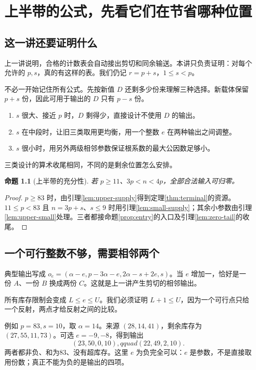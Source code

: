 \documentclass[11pt,a4paper,oneside,openany]{book}
\newtheorem{proposition}[theorem]{命题}
\theoremstyle{definition}
\numberwithin{equation}{chapter}
\begin{document}
\chapter{上半带的公式，先看它们在节省哪种位置}\label{ch:upper}
\section{这一讲还要证明什么}
上一讲说明，合格的计数表会自动接出剪切和同余输送。本讲只负责证明：对每个允许的 $p,s$，真的有这样的表。我们仍记 $r=p+s$，$1\le s<p$。

不必一开始记住所有公式。先按新值 $D$ 还剩多少份来理解三种选择。新载体保留 $p+s$ 份，因此可用于输出的 $D$ 只有 $p-s$ 份。
\begin{enumerate}
\item $s$ 很大、接近 $p$ 时，$D$ 剩得少，直接设计不使用 $D$ 的输出。
\item $s$ 在中段时，让旧三类取用更均衡，用一个整数 $e$ 在两种输出之间调整。
\item $s$ 很小时，用另外两级相邻参数保证根系数的最大公因数足够小。
\end{enumerate}
三类设计的算术收尾相同，不同的是剩余位置怎么安排。
\begin{proposition}[上半带的充分性]\label{prop:upper}
若 $p\ge11$、$3p<n<4p$，全部合法输入可归零。
\end{proposition}
\begin{proof}
$p\ge83$ 时，由引理\ref{lem:upper-supply}得到定理\ref{thm:terminal}的资源。$11\le p<83$ 且 $n=3p+s$、$s\le9$ 时用引理\ref{lem:small-supply}；其余小参数由引理\ref{lem:upper-small}处理。三者都接命题\ref{prop:entry}的入口及引理\ref{lem:zero-tail}的收尾。
\end{proof}

\section{一个可行整数不够，需要相邻两个}
典型输出写成 $o_e=(\alpha-e,p-3\alpha-e,2\alpha-s+2e,s)$。当 $e$ 增加一，恰好是一份 $A$、一份 $B$ 换成两份 $C$。这就是上一讲产生剪切的相邻输出。

所有库存限制会变成 $L\le e\le U$。我们必须证明 $L+1\le U$，因为一个可行点只给一个反射，两点才给反射之间的比较。

例如 $p=83,s=10$，取 $\alpha=14$。来源 $(28,14,41)$，剩余库存为 $(27,55,11,73)$。可选 $e=-9,-8$，得到输出
\[(23,50,0,10),qquad(22,49,2,10).
\]
两者都非负、和为83、没有超库存。这里 $e$ 为负完全可以：$e$ 是参数，不是直接取用份数；真正不能为负的是输出的四项。
\end{document}
